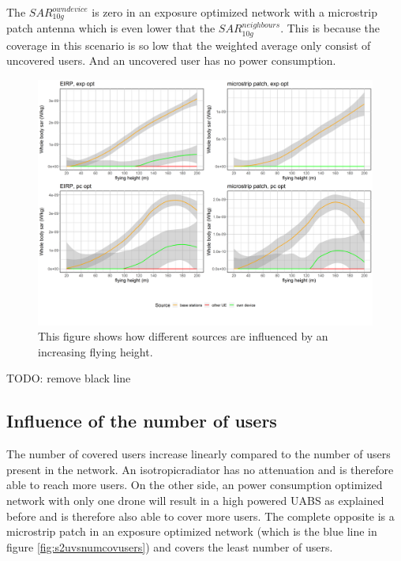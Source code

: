 The $SAR^{own device}_{10g}$ is zero in an exposure optimized network with a microstrip patch antenna which is even lower that the $SAR^{neighbours}_{10g}$.
This is because the coverage in this scenario is so low that the weighted average only consist of uncovered users. And an uncovered user has no power consumption.
\begin{figure}[h!]
  \includegraphics[width=\textwidth]{../results/s2/fhFourSources.png}
  \caption{This figure shows how different sources are influenced by an increasing flying height.}
  \label{fig:s2shfourSourcesMatrix}
\end{figure}

TODO: remove black line


\FloatBarrier
\subsection{Influence of the number of users}

The number of covered users increase linearly compared to the number of users present in the network.
An \gls{isotropicradiator} has no attenuation and is therefore able to reach more users. On the other side, an power consumption 
optimized network with only one drone will result in a high powered \gls{UABS} as explained before and is therefore also able to 
cover more users. The complete opposite is a microstrip patch in an exposure optimized network (which is the blue line in figure \ref{fig:s2uvsnumcovusers})
and covers the least number of users.

